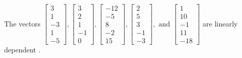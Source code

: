 \begin{exercise}
\begin{exerciseStatement}
  \end{exerciseStatement}
  \begin{exerciseAnswer}
   The vectors \(\left[\begin{array}{r}
3 \\
1 \\
-3 \\
1 \\
-5
\end{array}\right] , \left[\begin{array}{r}
3 \\
2 \\
1 \\
-1 \\
0
\end{array}\right] , \left[\begin{array}{r}
-12 \\
-5 \\
8 \\
-2 \\
15
\end{array}\right] , \left[\begin{array}{r}
2 \\
5 \\
3 \\
-1 \\
-3
\end{array}\right] , \text{ and } \left[\begin{array}{r}
1 \\
10 \\
-1 \\
11 \\
-18
\end{array}\right]\) are 
  	 linearly dependent  .
  


  \end{exerciseAnswer}
\end{exercise}